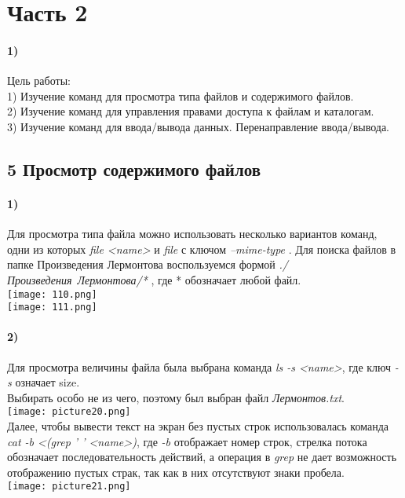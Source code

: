 \newpage
\section*{Часть 2}
	\paragraph{1)}
	Цель работы:  \\

	1) Изучение команд для просмотра типа файлов и содержимого файлов. \\

	2) Изучение команд для управления правами доступа к файлам и каталогам. \\

	3) Изучение команд для ввода/вывода данных. Перенаправление ввода/вывода. \\
	\subsection*{5 Просмотр содержимого файлов}
	
		\paragraph{1)}
	 	Для просмотра типа файла можно использовать несколько вариантов команд, 		одни из 			которых \textit{file <name>} и \textit{file} с ключом 			\textit{--mime-type} . Для 			поиска файлов в папке Произведения 				Лермонтова воспользуемся формой \textit{./				Произведения\ 				Лермонтова/*} , где * обозначает любой файл.
	\\
	\texttt{[image: 110.png]} %
	\\
	\texttt{[image: 111.png]} %
	\\
	
		\paragraph{2)}
		Для просмотра величины файла была выбрана команда \textit{ls -s <name>}, 		где ключ \textit{-s} означает size. \\
	Выбирать особо не из чего, поэтому был выбран файл \textit{Лермонтов.txt}.\\
	\texttt{[image: picture20.png]} 
	\\
		Далее, чтобы вывести текст на экран без пустых строк использовалась команда 	\textit{cat -b <(grep ' ' <name>)}, где \textit{-b} отображает номер строк, 		стрелка потока обозначает последовательность действий, а операция в  				\textit{grep} не дает возможность отображению пустых страк, так как в них 			отсутствуют знаки пробела.\\
	\texttt{[image: picture21.png]} 
	\\
	
